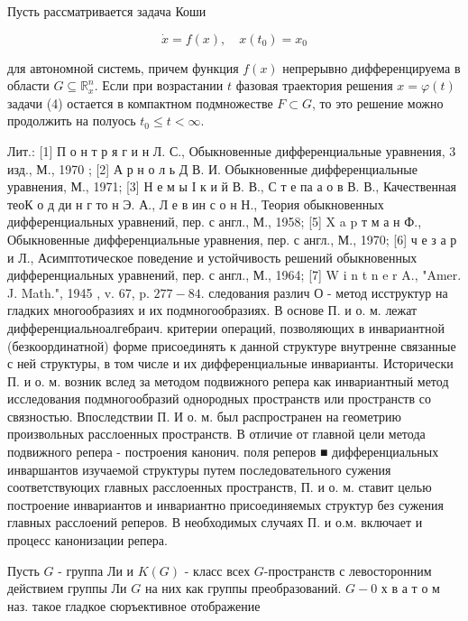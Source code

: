 \documentclass[10pt]{article}
\begin{document}
Пусть рассматривается задача Коши



\[

\dot{x}=f(x), \quad x\left(t_{0}\right)=x_{0}

\]



для автономной системь, причем функция $f(x)$ непрерывно дифференцируема в области $G \subseteq \mathbb{R}_{x}^{n}$. Если при возрастании $t$ фазовая траектория решения $x=\varphi(t)$ задачи (4) остается в компактном подмножестве $F \subset G$, то это решение можно продолжить на полуось $t_{0} \leqslant t<\infty$.



Лит.: [1] П о н т р я г и н Л. С., Обыкновенные дифференциальные уравнения, 3 изд., М., 1970 ; [2] А р н о л ь Д В. И. Обыкновенные дифференциальные уравнения, М., 1971; [3] Н е м ы І к и й В. В., С т е па а о в В. В., Качественная теоК о д ди н г то н Э. А., Л е в ин с о н Н., Теория обыкновенных дифференциальных уравнений, пер. с англ., М., 1958; [5] X a p т м а н Ф., Обыкновенные дифференциальные уравнения, пер. с англ., М., 1970; [6] ч е з а р и Л., Асимптотическое поведение и устойчивость решений обыкновенных дифференциальных уравнений, пер. с англ., М., 1964; [7] W i n t n e r A., "Amer. J. Math.", 1945 , v. 67, p. $277-84$. следования различ О - метод исструктур на гладких многообразиях и их подмногообразиях. В основе П. и о. м. лежат дифференциальноалгебраич. критерии операций, позволяющих в инвариантной (безкоординатной) форме присоединять к данной структуре внутренне связанные с ней структуры, в том числе и их дифференциальные инварианты. Исторически П. и о. м. возник вслед за методом подвижного репера как инвариантный метод исследования подмногообразий однородных пространств или пространств со связностью. Впоследствии П. И о. м. был распространен на геометрию произвольных расслоенных пространств. В отличие от главной цели метода подвижного репера - построения канонич. поля реперов ■ дифференциальных инваршантов изучаемой структуры путем последовательного сужения соответствуюцих главных расслоенных пространств, П. и о. м. ставит целью построение инвариантов и инвариантно присоединяемых структур без сужения главных расслоений реперов. В необходимых случаях П. и о.м. включает и процесс канонизации репера.



Пусть $G$ - группа Ли и $K(G)$ - класс всех $G$-пространств с левосторонним действием группы Ли $G$ на них как группы преобразований. $G-0$ х в а т о м наз. такое гладкое сюръективное отображение
\end{document}
